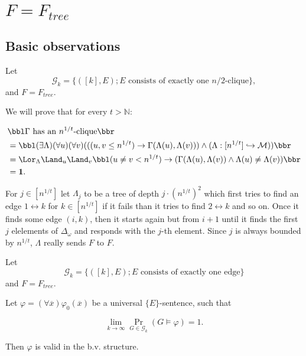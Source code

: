 \chapter{$F=F_{tree}$}

\section{Basic observations}

\begin{exam}
Let \[\mathcal{G}_k=\{([k],E);\text{$E$ consists of exactly one $n/2$-clique}\},\] and $F=F_{tree}$.

We will prove that for every $t>\mathbb{N}$: 

\begin{align}
&\bbl\text{$\Gamma$ has an $n^{1/t}$-clique}\bbr\\
&=\bbl(\exists \Lambda)(\forall u)(\forall v)(((u,v \leq n^{1/t})\to\Gamma(\Lambda(u),\Lambda(v)))\land(\Lambda:[n^{1/t}]\hookrightarrow\mathcal{M}))\bbr\\
&=\Lor_\Lambda\Land_u\Land_v\bbl(u\not=v < n^{1/t})\to(\Gamma(\Lambda(u),\Lambda(v))\land\Lambda(u)\not=\Lambda(v))\bbr\\
&=\textbf{1}.
\end{align}

For $j\in[n^{1/t}]$ let $\Lambda_j$ to be a tree of depth $j\cdot (n^{1/t})^2$ which first tries to find an edge $1\leftrightarrow k$ for $k\in[n^{1/t}]$ if it fails than it tries to find $2\leftrightarrow k$ and so on. Once it finds some edge $(i,k)$, then it starts again but from $i+1$ until it finds the first $j$ elelements of $\Delta_\omega$ and responds with the $j$-th element. Since $j$ is always bounded by $n^{1/t}$, $\Lambda$ really sends $F$ to $F$.

\end{exam}

\begin{exam}
Let \[\mathcal{G}_k=\{([k],E);\text{$E$ consists of exactly one edge}\}\]
and $F=F_{tree}$.


\end{exam}

\begin{thrm}\label{thrmusbv}
Let $\varphi=(\forall \overline x)\varphi_0(\overline x)$ be a universal $\{E\}$-sentence, such that

\[\lim_{k\to\infty}\Pr_{G\in\mathcal{G}_k}(G\models\varphi)=1.\]

Then $\varphi$ is valid in the b.v. structure.


\end{thrm}

